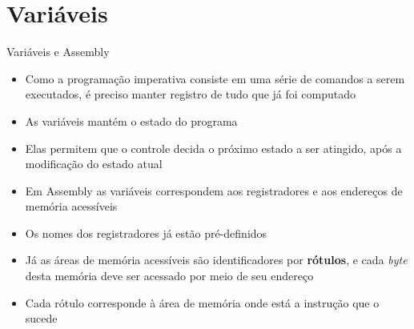 \section{Variáveis}

\begin{frame}[fragile]{Variáveis e Assembly}

    \begin{itemize}
        \item Como a programação imperativa consiste em uma série de comandos a serem executados,
            é preciso manter registro de tudo que já foi computado

        \item As variáveis mantém o estado do programa

        \item Elas permitem que o controle decida o próximo estado a ser atingido, após a 
            modificação do estado atual

        \item Em Assembly as variáveis correspondem aos registradores e aos endereços de memória
            acessíveis

        \item Os nomes dos registradores já estão pré-definidos

        \item Já as áreas de memória acessíveis são identificadores por \textbf{rótulos}, e cada
            \textit{byte} desta memória deve ser acessado por meio de seu endereço

        \item Cada rótulo corresponde à área de memória onde está a instrução que o sucede
    \end{itemize}

\end{frame}


